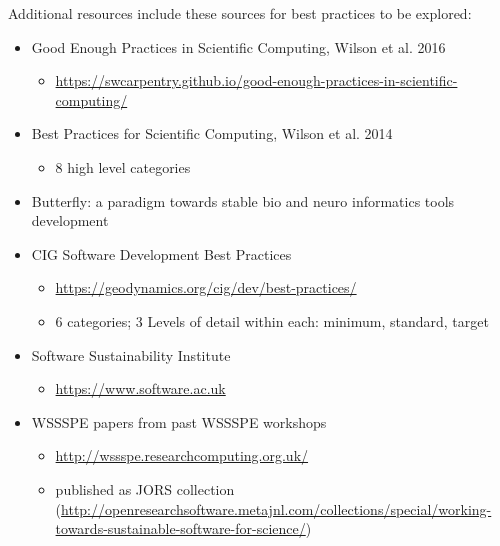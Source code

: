 \noindent
Additional resources include these sources for best practices to be explored: 

\begin{itemize}

\item Good Enough Practices in Scientific Computing, Wilson et al. 2016~\cite{DBLP:journals/corr/WilsonBCKNT16}
\begin{itemize}
\item \url{https://swcarpentry.github.io/good-enough-practices-in-scientific-computing/}
\end{itemize}

\item Best Practices for Scientific Computing, Wilson et al. 2014~\cite{bestprSC}
\begin{itemize}
\item 8 high level categories 
\end{itemize}

\item Butterfly: a paradigm towards stable bio and neuro informatics tools development~\cite{10.3389/conf.fnins.2015.91.00009}


\item CIG Software Development Best Practices
\begin{itemize}
\item \url{https://geodynamics.org/cig/dev/best-practices/}
\item 6 categories; 3 Levels of detail within each: minimum, standard, target
\end{itemize}


\item Software Sustainability Institute
\begin{itemize}
\item \url{https://www.software.ac.uk}
\end{itemize}

\item WSSSPE papers from past WSSSPE workshops
\begin{itemize}
\item \url{http://wssspe.researchcomputing.org.uk/}
\item published as JORS collection (\url{http://openresearchsoftware.metajnl.com/collections/special/working-towards-sustainable-software-for-science/})
\end{itemize}


\end{itemize}

